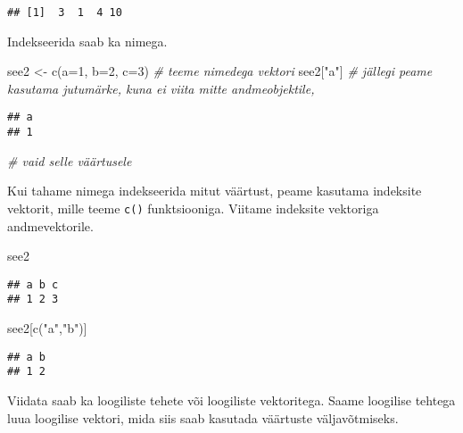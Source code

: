 \documentclass[
]{book}
\newenvironment{Shaded}{\begin{snugshade}}{\end{snugshade}}
\newcommand{\AttributeTok}[1]{\textcolor[rgb]{0.77,0.63,0.00}{#1}}
\newcommand{\CommentTok}[1]{\textcolor[rgb]{0.56,0.35,0.01}{\textit{#1}}}
\newcommand{\DecValTok}[1]{\textcolor[rgb]{0.00,0.00,0.81}{#1}}
\newcommand{\FunctionTok}[1]{\textcolor[rgb]{0.00,0.00,0.00}{#1}}
\newcommand{\NormalTok}[1]{#1}
\newcommand{\OtherTok}[1]{\textcolor[rgb]{0.56,0.35,0.01}{#1}}
\newcommand{\StringTok}[1]{\textcolor[rgb]{0.31,0.60,0.02}{#1}}
\begin{document}
\begin{verbatim}
## [1]  3  1  4 10
\end{verbatim}

Indekseerida saab ka nimega.

\begin{Shaded}
\begin{Highlighting}[]
\NormalTok{see2 }\OtherTok{\textless{}{-}} \FunctionTok{c}\NormalTok{(}\AttributeTok{a=}\DecValTok{1}\NormalTok{, }\AttributeTok{b=}\DecValTok{2}\NormalTok{, }\AttributeTok{c=}\DecValTok{3}\NormalTok{) }\CommentTok{\# teeme nimedega vektori}
\NormalTok{see2[}\StringTok{"a"}\NormalTok{] }\CommentTok{\# jällegi peame kasutama jutumärke, kuna ei viita mitte andmeobjektile, }
\end{Highlighting}
\end{Shaded}

\begin{verbatim}
## a 
## 1
\end{verbatim}

\begin{Shaded}
\begin{Highlighting}[]
          \CommentTok{\# vaid selle väärtusele}
\end{Highlighting}
\end{Shaded}

Kui tahame nimega indekseerida mitut väärtust, peame kasutama indeksite vektorit, mille teeme \texttt{c()} funktsiooniga. Viitame indeksite vektoriga andmevektorile.

\begin{Shaded}
\begin{Highlighting}[]
\NormalTok{see2}
\end{Highlighting}
\end{Shaded}

\begin{verbatim}
## a b c 
## 1 2 3
\end{verbatim}

\begin{Shaded}
\begin{Highlighting}[]
\NormalTok{see2[}\FunctionTok{c}\NormalTok{(}\StringTok{"a"}\NormalTok{,}\StringTok{"b"}\NormalTok{)]}
\end{Highlighting}
\end{Shaded}

\begin{verbatim}
## a b 
## 1 2
\end{verbatim}

Viidata saab ka loogiliste tehete või loogiliste vektoritega. Saame loogilise tehtega luua loogilise vektori, mida siis saab kasutada väärtuste väljavõtmiseks.
\end{document}
